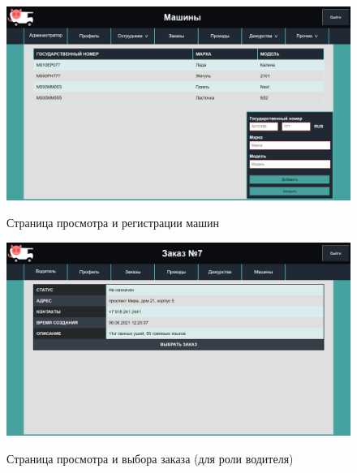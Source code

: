 \begin{figure}[h!] 
	\begin{center}
		{\includegraphics[scale=0.43, angle=0]{sc/trucks}}
		\caption{Страница просмотра и регистрации машин}
		\label{trucks_sc}
	\end{center}
\end{figure}

\begin{figure}[h!] 
	\begin{center}
		{\includegraphics[scale=0.4, angle=0]{sc/pick_delivery}}
		\caption{Страница просмотра и выбора заказа (для роли водителя)}
		\label{pick_delivery_sc}
	\end{center}
\end{figure}



